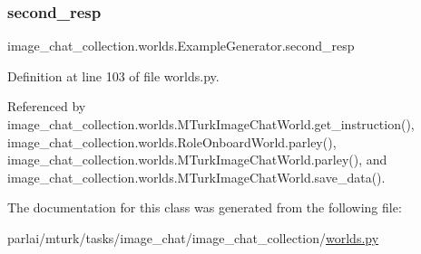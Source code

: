 \subsubsection{\texorpdfstring{second\+\_\+resp}{second\_resp}}
{\footnotesize\ttfamily image\+\_\+chat\+\_\+collection.\+worlds.\+Example\+Generator.\+second\+\_\+resp}



Definition at line 103 of file worlds.\+py.



Referenced by image\+\_\+chat\+\_\+collection.\+worlds.\+M\+Turk\+Image\+Chat\+World.\+get\+\_\+instruction(), image\+\_\+chat\+\_\+collection.\+worlds.\+Role\+Onboard\+World.\+parley(), image\+\_\+chat\+\_\+collection.\+worlds.\+M\+Turk\+Image\+Chat\+World.\+parley(), and image\+\_\+chat\+\_\+collection.\+worlds.\+M\+Turk\+Image\+Chat\+World.\+save\+\_\+data().



The documentation for this class was generated from the following file\+:\begin{DoxyCompactItemize}
\item 
parlai/mturk/tasks/image\+\_\+chat/image\+\_\+chat\+\_\+collection/\hyperlink{parlai_2mturk_2tasks_2image__chat_2image__chat__collection_2worlds_8py}{worlds.\+py}\end{DoxyCompactItemize}

